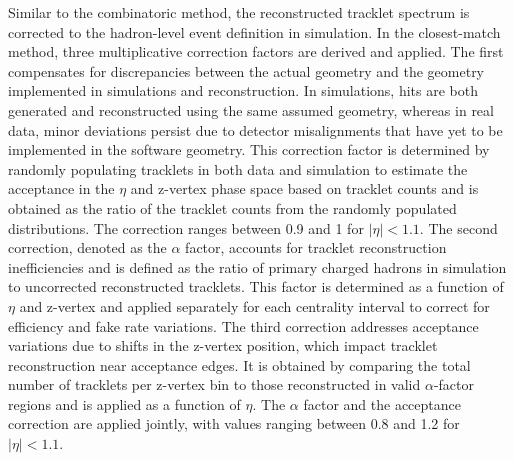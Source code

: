 Similar to the combinatoric method, the reconstructed tracklet spectrum is corrected to the hadron-level event definition in simulation. In the closest-match method, three multiplicative correction factors are derived and applied. The first compensates for discrepancies between the actual \intt geometry and the geometry implemented in simulations and reconstruction. In simulations, hits are both generated and reconstructed using the same assumed geometry, whereas in real data, minor deviations persist due to detector misalignments that have yet to be implemented in the software geometry. This correction factor is determined by randomly populating tracklets in both data and simulation to estimate the acceptance in the $\eta$ and z-vertex phase space based on tracklet counts and is obtained as the ratio of the tracklet counts from the randomly populated distributions. The correction ranges between 0.9 and 1 for $|\eta|<1.1$.
The second correction, denoted as the $\alpha$ factor, accounts for tracklet reconstruction inefficiencies and is defined as the ratio of primary charged hadrons in simulation to uncorrected reconstructed tracklets. This factor is determined as a function of $\eta$ and z-vertex and applied separately for each centrality interval to correct for efficiency and fake rate variations. The third correction addresses acceptance variations due to shifts in the z-vertex position, which impact tracklet reconstruction near acceptance edges. It is obtained by comparing the total number of tracklets per z-vertex bin to those reconstructed in valid $\alpha$-factor regions and is applied as a function of $\eta$.
The $\alpha$ factor and the acceptance correction are applied jointly, with values ranging between 0.8 and 1.2 for $|\eta|<1.1$.


